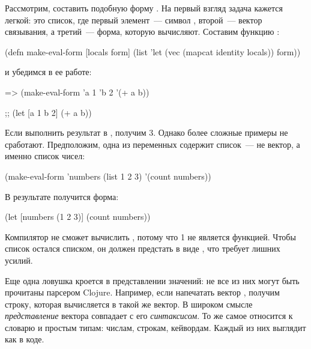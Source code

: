 Рассмотрим, составить подобную форму . На первый взгляд задача кажется легкой: это список, где первый элемент~--- символ , второй~--- вектор связывания, а третий~--- форма, которую вычисляют. Составим функцию :

\begin{english}
  \begin{clojure}
(defn make-eval-form
  [locals form]
  (list 'let (vec (mapcat identity locals)) form))
  \end{clojure}
\end{english}

\noindent
и убедимся в ее работе:

\begin{english}
  \begin{clojure}
=> (make-eval-form {'a 1 'b 2} '(+ a b))

;; (let [a 1 b 2] (+ a b))
  \end{clojure}
\end{english}

Если выполнить результат в , получим 3. Однако более сложные примеры не сработают. Предположим, одна из переменных содержит список~--- не вектор, а именно список чисел:

\begin{english}
  \begin{clojure}
(make-eval-form {'numbers (list 1 2 3)}
                '(count numbers))
  \end{clojure}
\end{english}

\pagebreaklarge

В результате получится форма:

\begin{english}
  \begin{clojure}
(let [numbers (1 2 3)]
  (count numbers))
  \end{clojure}
\end{english}

Компилятор не сможет вычислить , потому что 1 не является функцией. Чтобы список остался списком, он должен предстать в виде , что требует лишних усилий.

Еще одна ловушка кроется в представлении значений: не все из них могут быть прочитаны парсером Clojure. Например, если напечатать вектор \code{[1 2 3]}, получим строку, которая вычисляется в такой же вектор. В широком смысле \emph{представление} вектора совпадает с его \emph{синтаксисом}. То же самое относится к словарю и простым типам: числам, строкам, кейвордам. Каждый из них выглядит как в коде.

